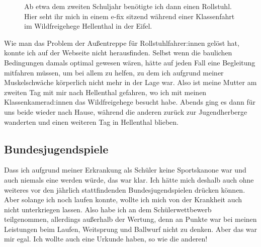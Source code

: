 \documentclass[fontsize=14pt,a4paper,headinclude,DIV=calc,automark]{scrbook}
\begin{document}
\setlength{\fboxsep}{0pt}    %
\setlength{\fboxrule}{0.2pt} %
\begin{figure}[ht]
    \centering
    \caption{Ab etwa dem zweiten Schuljahr benötigte ich dann einen Rollstuhl. Hier seht ihr mich in einem e-fix sitzend während einer Klassenfahrt im Wildfreigehege Hellenthal in der Eifel.}
    \label{fig:schule1}
\end{figure}

Wie man das Problem der Außentreppe für Rollstuhlfahrer:innen gelöst hat, konnte ich auf der Webseite nicht herausfinden. Selbst wenn die baulichen Bedingungen damals optimal gewesen wären, hätte auf jeden Fall eine Begleitung mitfahren müssen, um bei allem zu helfen, zu dem ich aufgrund meiner Muskelschwäche körperlich nicht mehr in der Lage war. Also ist meine Mutter am zweiten Tag mit mir nach Hellenthal gefahren, wo ich mit meinen Klassenkamerad:innen das Wildfreigehege besucht habe. Abends ging es dann für uns beide wieder nach Hause, während die anderen zurück zur Jugendherberge wanderten und einen weiteren Tag in Hellenthal blieben.

\subsection{Bundesjugendspiele}

Dass ich aufgrund meiner Erkrankung als Schüler keine Sportskanone war und auch niemals eine werden würde, das war klar. Ich hätte mich deshalb auch ohne weiteres vor den jährlich stattfindenden Bundesjugendspielen drücken können. Aber solange ich noch laufen konnte, wollte ich mich von der Krankheit auch nicht unterkriegen lassen. Also habe ich an dem Schülerwettbewerb teilgenommen, allerdings außerhalb der Wertung, denn an Punkte war bei meinen Leistungen beim Laufen, Weitsprung und Ballwurf nicht zu denken. Aber das war mir egal. Ich wollte auch eine Urkunde haben, so wie die anderen!
\end{document}
